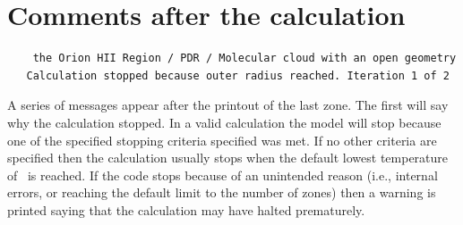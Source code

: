 \section{Comments after the calculation}
\label{sec:CommentsAfterCalculation}

{\setverbatimfontsize{\tiny}
\begin{verbatim}
    the Orion HII Region / PDR / Molecular cloud with an open geometry
   Calculation stopped because outer radius reached. Iteration 1 of 2
\end{verbatim}
}
A series of messages appear after the printout of the last zone.
The
first will say why the calculation stopped.
In a valid calculation the
model will stop because one of the specified stopping criteria specified
was met.
If no other criteria are specified then the calculation usually
stops when the default lowest temperature of
\TEMPSTOPDEFAULT\ is reached.
If the
code stops because of an unintended reason (i.e., internal errors, or
reaching the default limit to the number of zones) then a warning is printed
saying that the calculation may have halted prematurely.

